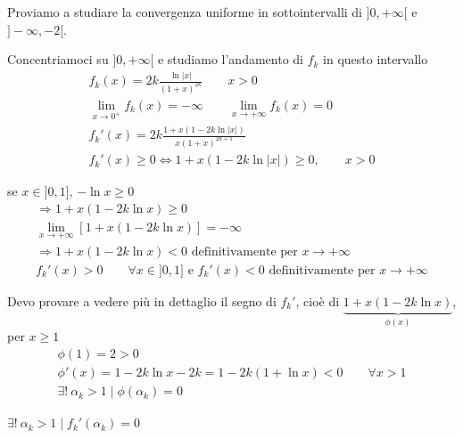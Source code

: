 \begin{exbar}
\begin{example}
	Proviamo a studiare la convergenza uniforme in sottointervalli di $]0,+\infty[$ e $]-\infty,-2[$.
	
	Concentriamoci su $]0,+\infty[$ e studiamo l'andamento di $f_k$ in questo intervallo
	\begin{gather*}
		f_k(x) = 2k \frac{\ln |x|}{(1+x)^{2k}} \qquad x >0
		\\
		\lim_{x \rightarrow 0^+} f_k(x) = -\infty \qquad \lim_{x \rightarrow +\infty} f_k(x) = 0
		\\
		f_k' (x) = 2k \frac{1+x(1-2k \ln |x|)}{x(1+x)^{2k+1}}
		\\
		f_k' (x) \geq 0 \iff 1+x(1-2k \ln |x|) \geq 0, \qquad x >0
	\end{gather*}

	se $x \in ]0,1]$, $-\ln x \geq 0$
	\begin{gather*}
		\Rightarrow 1+x(1-2k\ln x)\geq 0
		\\
		\lim_{x \rightarrow +\infty} [1+x(1-2k\ln x)]= -\infty
		\\
		\Rightarrow 1+x(1-2k\ln x)<0 \text{ definitivamente per } x \rightarrow +\infty
		\\
		f_k' (x) > 0 \qquad \forall x \in ]0,1] \text{ e } f_k' (x) < 0 \text{ definitivamente per } x \rightarrow +\infty
	\end{gather*} 
	
	
	
	Devo provare a vedere più in dettaglio il segno di $f_k' $, cioè di $\underbrace{1+x(1-2k \ln x)}_{\phi(x)}$, per $x \geq 1$
	\begin{gather*}
		\phi(1) = 2 > 0
		\\
		\phi'(x)=1-2k\ln x -2k = 1-2k(1+\ln x)< 0 \qquad \forall x >1
		\\
		\exists! \ \alpha_k > 1 \; \big| \; \phi(\alpha_k) = 0
	\end{gather*}
	
	
	{ \centering $\exists! \ \alpha_k >1 \; \big| \; f_k' (\alpha_k)=0$ \par}
	

\end{example}
\end{exbar}
